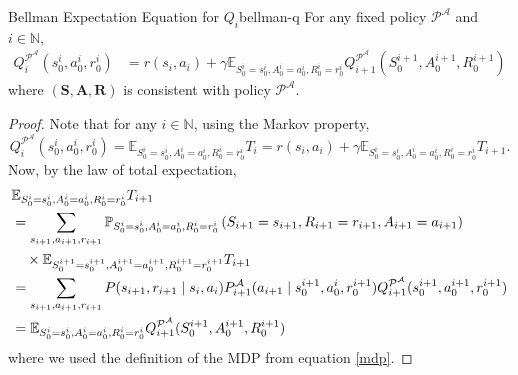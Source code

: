 \documentclass[a4paper, 11pt]{article}
\numberwithin{equation}{section}
\theoremstyle{plain}
\theoremstyle{definition}
\newcommand{\E}{{\mathbb E}}
\newcommand{\1}{{\mathbbm 1}}
\newcommand{\mb}[1]{\mathbf{#1}}
\newcommand{\mc}[1]{\mathcal{#1}}
\newcommand{\N}{{\mathbb{N}}}
\begin{document}
	\begin{ftheo}{Bellman Expectation Equation for $Q_i$}{bellman-q}
		For any fixed policy $\mc{P}^{\mc{A}}$ and $i \in \N$,
		\begin{equation}\label{recurrence qi}
			\begin{split}
				Q_i^{\mc{P}^\mc{A}}(s_0^i, a_0^{i }, r_0^i) &= r(s_i, a_i) + \gamma\E_{S_0^i = s_0^i, A_0^{i} = a_0^{i}, R_0^i = r_0^i} Q_{i + 1}^{\mc{P}^\mc{A}}(S_0^{i+1}, A_0^{i+1}, R_0^{i+1})
			\end{split}
		\end{equation}
		where $(\mb{S}, \mb{A}, \mb{R})$ is consistent with policy $\mc{P}^{\mc{A}}$.
	\end{ftheo}
	
	\begin{proof}
		Note that for any $i \in \N$, using the Markov property,
		\begin{equation*}
			Q_i^{\mc{P}^\mc{A}}(s_0^i, a_0^{i }, r_0^i) =  \E_{S_0^i = s_0^i, A_0^{i} = a_0^{i}, R_0^i = r_0^i} T_i =  r(s_i, a_i) + \gamma \E_{S_0^i = s_0^i, A_0^{i} = a_0^{i}, R_0^i = r_0^i} T_{i + 1}.
		\end{equation*}
		Now, by the law of total expectation,
		\begin{equation*}
			\begin{split}
				&\E_{S_0^i = s_0^i, A_0^{i} = a_0^{i}, R_0^i = r_0^i} T_{i + 1}\\
				& = \sum_{s_{i + 1}, a_{i + 1}, r_{i + 1}}\pof[S_{i + 1} =  s_{i + 1}, R_{i + 1} = r_{i + 1}, A_{i + 1} =  a_{i + 1}][S_0^i = s_0^i, A_0^{i} = a_0^{i}, R_0^i = r_0^i] \\
				&\quad \times \E_{S_0^{i + 1} = s_0^{i + 1}, A_0^{i + 1} = a_0^{i + 1}, R_0^{i + 1} = r_0^{i + 1}} T_{i + 1}\\
				&= \sum_{s_{i + 1}, a_{i + 1}, r_{i + 1}} P(s_{i + 1},r_{i + 1}\;|\; s_i, a_i) P^{\mc{A}}_{i + 1}( a_{i + 1}\;|\;s_0^{i + 1}, a_0^{i }, r_0^{i + 1}) Q_{i + 1}^{\mc{P}^\mc{A}}(s_0^{i + 1}, a_0^{i  + 1}, r_0^{i + 1})\\
				&  = \E_{S_0^i = s_0^i, A_0^{i} = a_0^{i}, R_0^i = r_0^i} Q_{i + 1}^{\mc{P}^\mc{A}}(S_0^{i+1}, A_0^{i+1}, R_0^{i+1})
			\end{split}
		\end{equation*}
		where we used the definition of the MDP from equation \eqref{mdp}.
	\end{proof}
	
\end{document}
